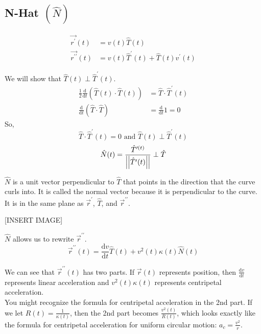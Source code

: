 \subsection{N-Hat $\left(\hat{N}\right)$}
\noindent
\begin{align*}
	\vec{r^{\prime}}(t) &= v(t)\hat{T}(t) \\
	\vec{r^{\prime\prime}}(t) &= v(t)\hat{T}^{\prime}(t)+\hat{T}(t)v^{\prime}(t)
\end{align*}

\noindent
We will show that $\hat{T}(t) \perp \hat{T}^{\prime}(t)$.
\begin{align*}
	\frac{1}{2}\frac{\mathrm{d}}{\mathrm{d}t}\left(\hat{T}(t)\cdot\hat{T}(t)\right) &= \hat{T}\cdot\hat{T}^{\prime}(t) \\
	\frac{\mathrm{d}}{\mathrm{d}t}\left(\hat{T}\cdot\hat{T}\right) &= \frac{\mathrm{d}}{\mathrm{d}t}1 = 0
\end{align*}
So, 
\begin{equation*}
	\hat{T}\cdot\hat{T}^{\prime}(t) = 0 \text{ and } \hat{T}(t) \perp \hat{T}^{\prime}(t)
\end{equation*}
\begin{equation*}
	\hat{N}(t)=\frac{\hat{T}^{\prime(t)}}{\left|\left|\hat{T}^{\prime}(t)\right|\right|}\perp\hat{T}
\end{equation*}

\noindent
$\hat{N}$ is a unit vector perpendicular to $\hat{T}$ that points in the direction that the curve curls into. It is called the normal vector because it is perpendicular to the curve. It is in the same plane as $\vec{r}^\prime$, $\hat{T}$, and  $\vec{r}^{\prime\prime}$.

[INSERT IMAGE]

\noindent
$\hat{N}$ allows us to rewrite $\vec{r}^{\prime\prime}$.\\
\begin{equation*}
	\vec{r}^{\prime\prime}(t)=\frac{\mathrm{d}v}{\mathrm{d}t}\hat{T}(t)+v^{2}(t)\kappa(t)\hat{N}(t)
\end{equation*}

\noindent
We can see that $\vec{r}^{\prime\prime}(t)$ has two parts. If $\vec{r}(t)$ represents position, then $\frac{\mathrm{d}v}{\mathrm{d}t}$ represents linear acceleration and $v^2(t)\kappa(t)$ represents centripetal acceleration.\\ 
You might recognize the formula for centripetal acceleration in the 2nd part. If we let $R(t) = \frac{1}{\kappa(t)}$, then the 2nd part becomes $\frac{v^2(t)}{R(t)}$, which looks exactly like the formula for centripetal acceleration for uniform circular motion: $a_c = \frac{v^2}{r}$.